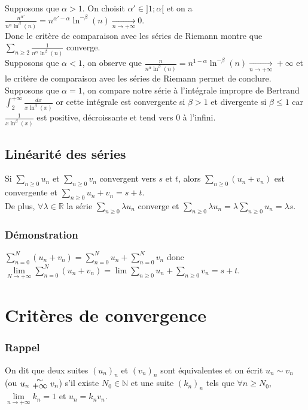 \documentclass[a4paper,10pt]{book} %
\newcommand{\R}{\mathbb{R}}
\newcommand{\N}{\mathbb{N}}
\newcommand{\equi}[1]{\renewcommand{\arraystretch}{0.3}~\begin{matrix}\sim\\#1\end{matrix}~\renewcommand{\arraystretch}{1}}
\newcommand{\displayAmath}{\displaystyle}
\begin{document}
Supposons que $\alpha>1$. On choisit $\alpha'\in]1;\alpha[$ et on a $\frac{n^{\alpha'}}{n^\alpha\ln^\beta(n)}=n^{\alpha'-\alpha}\ln^{-\beta}(n) \underset{n\rightarrow+\infty}\rightarrow 0$. \\
Donc le critère de comparaison avec les séries de Riemann montre que $\sum_{n\geq 2} \frac{1}{n^\alpha\ln^\beta(n)}$ converge.\\

Supposons que $\alpha<1$, on observe que $\frac{n}{n^\alpha\ln^\beta(n)}=n^{1-\alpha}\ln^{-\beta}(n) \underset{n\rightarrow+\infty}{\rightarrow}+\infty$ et le critère de comparaison avec les séries de Riemann permet de conclure.\\

Supposons que $\alpha=1$, on compare notre série à l'intégrale impropre de Bertrand $\displayAmath\int_2^{+\infty}\frac{dx}{x\ln^\beta(x)}$ or cette intégrale est convergente si $\beta>1$ et divergente si $\beta\leq 1$ car $\frac{1}{x\ln^\beta(x)}$ est positive, décroissante et tend vers 0 à l'infini.

\subsection{Linéarité des séries}
Si $\displayAmath \sum_{n\geq 0}u_n$ et $\displayAmath \sum_{n\geq 0}v_n$ convergent vers $s$ et $t$, alors $\displayAmath \sum_{n\geq 0}(u_n+v_n)$ est convergente et $\displayAmath \sum_{n\geq 0}u_n+v_n=s+t$.\\

De plus, $\forall\lambda\in \R$ la série $\displayAmath \sum_{n\geq 0}\lambda u_n$ converge et $\displayAmath \sum_{n\geq 0}\lambda u_n=\lambda \sum_{n\geq 0}u_n=\lambda s$.

\subsubsection{Démonstration}
$\displayAmath \sum_{n=0}^N(u_n+v_n)=\sum_{n=0}^Nu_n+\sum_{n=0}^Nv_n$ donc $\displayAmath \lim\limits_{N\rightarrow+\infty} \sum_{n=0}^N(u_n+v_n)=\lim\sum_{n\geq 0}u_n+\sum_{n\geq 0}v_n=s+t$.

\newpage

\section{Critères de convergence}
\subsubsection{Rappel}\small
On dit que deux suites $(u_n)_n$ et $(v_n)_n$ sont équivalentes et on écrit $u_n\sim v_n$ (ou $u_n\equi{+\infty}v_n$) s'il existe $N_0 \in\N$ et une suite $(k_n)_n$ tels que $\forall n\geq N_0$, $\lim\limits_{n\rightarrow+ \infty}k_n=1$ et $u_n=k_nv_n$.\\
\end{document}

